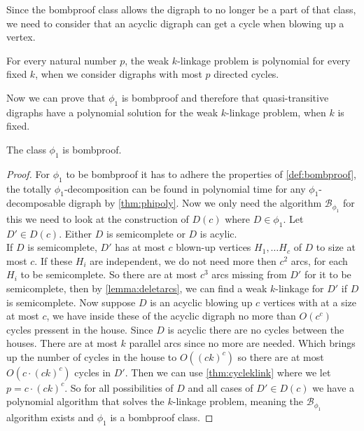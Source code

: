Since the bombproof class allows the digraph to no longer be a part of that class, we need to consider that an acyclic digraph can get a cycle when blowing up a vertex. 
\begin{thm}
    For every natural number $p$, the weak $k$-linkage problem is polynomial for every fixed $k$, when we consider digraphs with most $p$ directed cycles.
    \label{thm:cycleklink}
\end{thm}

Now we can prove that $\phi_1$ is bombproof and therefore that quasi-transitive digraphs have a polynomial solution for the weak $k$-linkage problem, when $k$ is fixed.

\begin{thm}
    The class $\phi_1$ is bombproof.
    \label{thm:phi1bomb}
\end{thm}
\begin{proof}
    For $\phi_1$ to be bombproof it has to adhere the properties of \autoref{def:bombproof}, the totally $\phi_1$-decomposition can be found in polynomial time for any $\phi_1$-decomposable digraph by \autoref{thm:phipoly}.
    Now we only need the algorithm $\mathcal{B}_{\phi_1}$ for this we need to look at the construction of $D(c)$ where $D\in \phi_1$.
    Let $D'\in D(c)$. 
    Either $D$ is semicomplete or $D$ is acylic.\\
    If $D$ is semicomplete, $D'$ has at most $c$ blown-up vertices $H_1,\dots H_c$ of $D$ to size at most $c$.
    If these $H_i$ are independent, we do not need more then $c^2$ arcs, for each $H_i$ to be semicomplete. 
    So there are at most $c^3$ arcs missing from $D'$ for it to be semicomplete, then by \autoref{lemma:deletarcs}, we can find a weak $k$-linkage for $D'$ if $D$ is semicomplete.
    Now suppose $D$ is an acyclic blowing up $c$ vertices with at a size at most $c$, we have inside these of the acyclic digraph no more than $O(c^c)$ cycles pressent in the house.
    Since $D$ is acyclic there are no cycles between the houses. 
    There are at most $k$ parallel arcs since no more are needed. 
    Which brings up the number of cycles in the house to $O((ck)^c)$ so there are at most $O(c\cdot (ck)^c)$ cycles in $D'$. 
    Then we can use \autoref{thm:cycleklink} where we let $p=c\cdot (ck)^c$.
    So for all possibilities of $D$ and all cases of $D'\in D(c)$ we have a polynomial algorithm that solves the $k$-linkage problem, meaning the $\mathcal{B}_{\phi_1}$ algorithm exists and $\phi_1$ is a bombproof class.
\end{proof}

